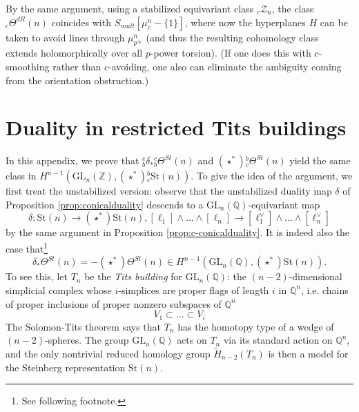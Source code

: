 \documentclass[10pt]{amsart}
\theoremstyle{definition}
\newcommand{\Z}{\mathbb{Z}}
\newcommand{\cZ}{\mathcal{Z}}
\newcommand{\Q}{\mathbb{Q}}
\newcommand{\St}{\mathrm{St}}
\newcommand{\GL}{\mathrm{GL}}
\numberwithin{equation}{section}
\begin{document}
    By the same argument, using a stabilized equivariant class ${}_c\cZ_n$, the class ${}_c\Theta^{dR}(n)$ coincides with $S_{mult}[\mu_{c}^n-\{1\}]$, where now the hyperplanes $H$ can be taken to avoid lines through $\mu_{p^\infty}^n$ (and thus the resulting cohomology class extends holomorphically over all $p$-power torsion). (If one does this with $c$-smoothing rather than $c$-avoiding, one also can eliminate the ambiguity coming from the orientation obstruction.)

\section{Duality in restricted Tits buildings} \label{appendix:b}

In this appendix, we prove that ${}^c_b\delta_*{}^c_b\Theta^{St}(n)$ and $(\star^*){}^b_c\Theta^{St}(n)$ yield the same class in $H^{n-1}(\GL_n(\Z), (\star^*){}^b_c\St(n))$. To give the idea of the argument, we first treat the unstabilized version: observe that the unstabilized duality map $\delta$ of Proposition \ref{prop:conicalduality} descends to a $\GL_n(\Q)$-equivariant map
\[
\delta: \St(n)\to (\star^*)\St(n), [\ell_1]\wedge \ldots \wedge [\ell_n] \to [\ell_1^\vee]\wedge \ldots \wedge [\ell_n^\vee]
\]
by the same argument in Proposition \ref{prop:c-conicalduality}. It is indeed also the case that\footnote{See following footnote.} 
\begin{equation}  \label{eq:untwistedduality}
\delta_* \Theta^{St}(n) = - (\star^*) \Theta^{St}(n) \in H^{n-1}(\GL_n(\Q),(\star^*)\St(n)).
\end{equation}
To see this, let $T_n$ be the \emph{Tits building} for $\GL_n(\Q)$: the $(n-2)$-dimensional simplicial complex whose $i$-simplices are proper flags of length $i$ in $\Q^n$, i.e. chains of proper inclusions of proper nonzero subspaces of $\Q^n$
\[
V_1\subset \ldots \subset V_i
\]
The Solomon-Tits theorem says that $T_n$ has the homotopy type of a wedge of $(n-2)$-spheres. The group $\GL_n(\Q)$ acts on $T_n$ via its standard action on $\Q^n$, and the only nontrivial reduced homology group $\widetilde{H}_{n-2}(T_n)$ is then a model for the Steinberg representation $\St(n)$.
\end{document}
